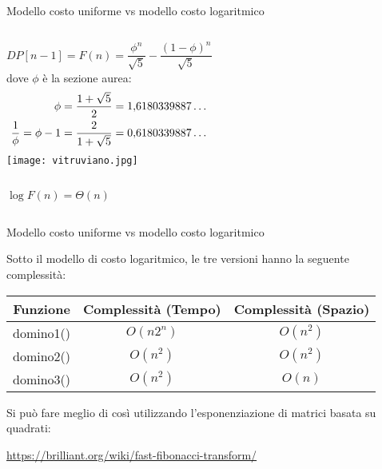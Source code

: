 \begin{frame}{Modello costo uniforme vs modello costo logaritmico}

\vspace{-9pt}
\begin{myboxtitle}
\vspace{6pt}
\begin{columns}[T]
\[
\mathit{DP}[n-1] = F(n) = \frac{\phi^n}{\sqrt{5}} - \frac{(1-\phi)^n}{\sqrt{5}} 
\]
dove $\phi$ è la \alert{sezione aurea}:
\begin{align*}
\phi &={1+\sqrt 5 \over 2}=1{,}6180339887\dots  \\
\frac{1}{\phi} = \phi - 1 & ={2 \over 1+\sqrt 5 }=0{,}6180339887\dots 
\end{align*}
\texttt{[image: vitruviano.jpg]}
\end{columns}
\end{myboxtitle}


\begin{columns}[T]
\vspace{-6pt}
\pause
{}

\bigskip
\alert{$\log F(n) = \Theta(n)$}
\end{columns}

\end{frame}


\begin{frame}{Modello costo uniforme vs modello costo logaritmico}
  
Sotto il modello di costo logaritmico, le tre versioni hanno la seguente
complessità:

\begin{center}
\begin{tabular}{|c|c|c|}
\hline
\textbf{Funzione} & \textbf{Complessità (Tempo)} & \textbf{Complessità (Spazio)} \\\hline
\textsf{domino1()} & $O(n2^n)$ & $O(n^2)$ \\\hline
\textsf{domino2()} & $O(n^2)$ & $O(n^2)$ \\\hline
\textsf{domino3()} & $O(n^2)$ & $O(n)$ \\\hline
\end{tabular}
\end{center}

\bigskip
Si può fare meglio di così utilizzando l'esponenziazione di matrici basata
su quadrati:

\bigskip
\url{https://brilliant.org/wiki/fast-fibonacci-transform/}


\end{frame}

